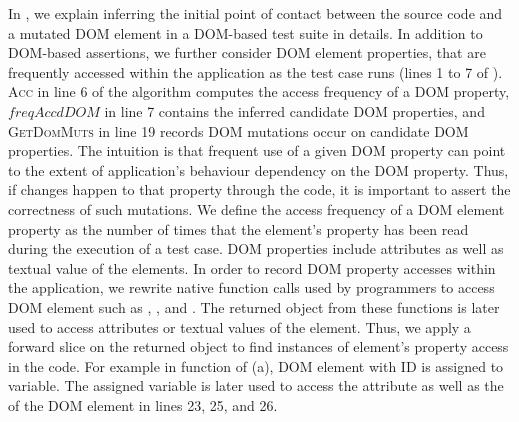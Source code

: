 In , we explain inferring the initial point of contact between the source code and a mutated DOM element in a DOM-based test suite in details.  
In addition to DOM-based assertions, we further consider DOM element properties, that are frequently accessed within the application as the test case runs (lines 1 to 7 of ). 
\textsc{Acc} in line 6 of the algorithm computes the access frequency of a DOM property, $freqAccdDOM$ in line 7 contains the inferred candidate DOM properties, and \textsc{GetDomMuts} in line 19 records DOM mutations occur
on candidate DOM properties.
The intuition is that frequent use of a given DOM property can point to the extent of application's behaviour dependency on the DOM property. Thus, if changes happen to that property through the \javascript code, it is important to assert the correctness of such mutations. We define the access frequency of a DOM element property as the number of times that the element's property has been read during the execution of a test case. DOM properties include attributes as well as textual value of the elements.
In order to record DOM property accesses within the application, we rewrite native function calls used by programmers to access DOM element such as , , and . The returned object from these functions is later used to access attributes or textual values of the element. Thus, we apply a forward slice on the returned object to find instances of element's property access in the code.
For example in function  of (a), DOM element with ID  is assigned to  variable. The assigned variable is later used to access the  attribute as well as the 
of the DOM element in lines 23, 25, and 26.

